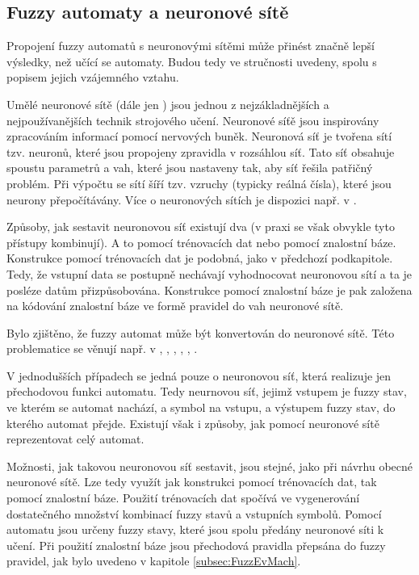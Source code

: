 \documentclass[a4paper,10pt]{article}
\begin{document}
\subsection{Fuzzy automaty a neuronové sítě}
Propojení fuzzy automatů s neuronovými sítěmi může přinést značně lepší výsledky, než učící se automaty. Budou tedy ve stručnosti uvedeny, spolu s popisem jejich vzájemného vztahu.

Umělé neuronové sítě (dále jen ) jsou jednou z nejzákladnějších a nejpoužívanějších technik strojového učení. Neuronové síťě jsou inspirovány zpracováním informací pomocí nervových buněk. Neuronová síť je tvořena sítí tzv. neuronů, které jsou propojeny zpravidla v rozsáhlou síť. Tato síť obsahuje spoustu parametrů a vah, které jsou nastaveny tak, aby síť řešila patřičný problém. Při výpočtu se sítí šíří tzv. vzruchy (typicky reálná čísla), které jsou neurony přepočítávány. Více o neuronových sítích je dispozici např. v \cite{FieRus-HanNeuCom}.

Způsoby, jak sestavit neuronovou síť existují dva (v praxi se však obvykle tyto přístupy kombinují). A to pomocí trénovacích dat nebo pomocí znalostní báze. Konstrukce pomocí trénovacích dat je podobná, jako v předchozí podkapitole. Tedy, že vstupní data se postupně nechávají vyhodnocovat neuronovou sítí a ta je posléze datům přizpůsobována. Konstrukce pomocí znalostní báze je pak založena na kódování znalostní báze ve formě \ifthen pravidel do vah neuronové sítě.

Bylo zjištěno, že fuzzy automat může být konvertován do neuronové sítě. Této problematice se věnují např. v \cite{DarAhmSin-AppFuzzAutTheKnBsNeuNetDevBasLeaMod}, \cite{OmlThoGil-FuzzFinStaAutCanDetEncIntRecNeuNet} \cite{BlaDelPeg-FuzzAutIndUsNeuNet}, \cite{GilOmlTho-EquKnoRep+}, \cite{OmlThoGil-RepFuzFinStaAuConRecNeuNet}, \cite{UnaKha-FuzDFinStaMachImpBasNeuFuzSys}, \cite{PedGac-LeaFuzzAut}.

V jednodušších případech se jedná pouze o neuronovou síť, která realizuje jen přechodovou funkci automatu. Tedy neurnovou síť, jejimž vstupem je fuzzy stav, ve kterém se automat nachází, a symbol na vstupu, a výstupem fuzzy stav, do kterého automat přejde. Existují však i způsoby, jak pomocí neuronové sítě reprezentovat celý automat.

Možnosti, jak takovou neuronovou síť sestavit, jsou stejné, jako při návrhu obecné neuronové sítě. Lze tedy využít jak konstrukci pomocí trénovacích dat, tak pomocí znalostní báze. Použití trénovacích dat spočívá ve vygenerování dostatečného množství kombinací fuzzy stavů a vstupních symbolů. Pomocí automatu jsou určeny  fuzzy stavy, které jsou spolu předány neuronové síti k učení. Při použití znalostní báze jsou přechodová pravidla přepsána do fuzzy \ifthen pravidel, jak bylo uvedeno v kapitole \ref{subsec:FuzzEvMach}.
\end{document}
